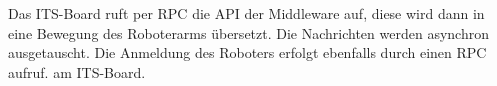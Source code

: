 



	Das ITS-Board ruft per RPC die API der Middleware auf, diese wird dann in eine Bewegung des Roboterarms übersetzt. Die Nachrichten werden asynchron ausgetauscht. Die Anmeldung des Roboters erfolgt ebenfalls durch einen RPC aufruf. am ITS-Board.
	
